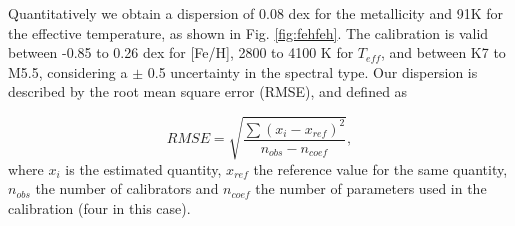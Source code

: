 \documentclass{aa}
\begin{document}
Quantitatively we obtain a dispersion of 0.08 dex for the metallicity and 91K for the effective temperature, as shown in Fig. \ref{fig:fehfeh}. The calibration is valid between -0.85 to 0.26 dex for [Fe/H], 2800 to 4100 K for $T_{eff}$, and between K7 to M5.5, considering a $\pm$ 0.5 uncertainty in the spectral type. Our dispersion is described by the root mean square error (RMSE), and defined as

\begin{equation}
RMSE = \sqrt{\frac{\sum{(x_{i}-x_{ref})^{2}}}{n_{obs}-n_{coef}}},
\end{equation}
where $x_{i}$ is the estimated quantity, $x_{ref}$ the reference value for the same quantity, $n_{obs}$ the number of calibrators and $n_{coef}$ the number of parameters used in the calibration (four in this case). 
\end{document}
